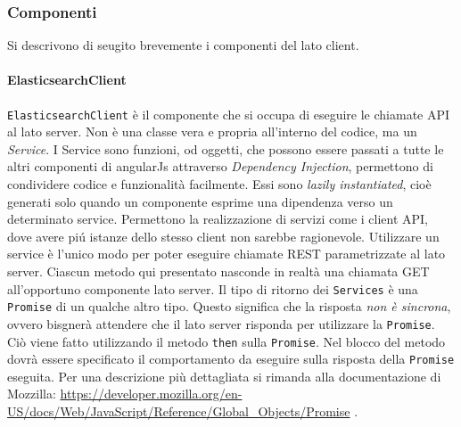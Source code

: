 \subsubsection{Componenti} 
\label{sec:Componenti}
Si descrivono di seugito brevemente i componenti del lato client.

\paragraph{ElasticsearchClient} \Spazio
\label{sec:elasticsearchClient}
\texttt{ElasticsearchClient} è il componente che si occupa di eseguire le chiamate API al lato server. Non è una classe vera e propria all'interno del codice, ma un \emph{Service}. 
I Service sono funzioni, od oggetti, che possono essere passati a tutte le altri componenti di angularJs attraverso \emph{Dependency Injection}, permettono di condividere codice e funzionalità facilmente. Essi sono \emph{lazily instantiated}, cioè generati solo quando un componente esprime una dipendenza verso un determinato service. Permettono la realizzazione di servizi come i client API, dove avere piú istanze dello stesso client non sarebbe ragionevole. 
Utilizzare un service è l'unico modo per poter eseguire chiamate REST parametrizzate al lato server. Ciascun metodo qui presentato nasconde in realtà una chiamata GET all'opportuno componente lato server. 
Il tipo di ritorno dei \texttt{Services} è una \texttt{Promise} di un qualche altro tipo. Questo significa che la risposta \emph{non è sincrona}, ovvero bisgnerà attendere che il lato server risponda per utilizzare la \texttt{Promise}. Ciò viene fatto utilizzando il metodo \texttt{then} sulla \texttt{Promise}. Nel blocco del metodo dovrà essere specificato il comportamento da eseguire sulla risposta della \texttt{Promise} eseguita. Per una descrizione più dettagliata si rimanda alla documentazione di Mozzilla: \href{https://developer.mozilla.org/en-US/docs/Web/JavaScript/Reference/Global\_Objects/Promise}{https://developer.mozilla.org/en-US/docs/Web/JavaScript/Reference/Global\_Objects/Promise} .

